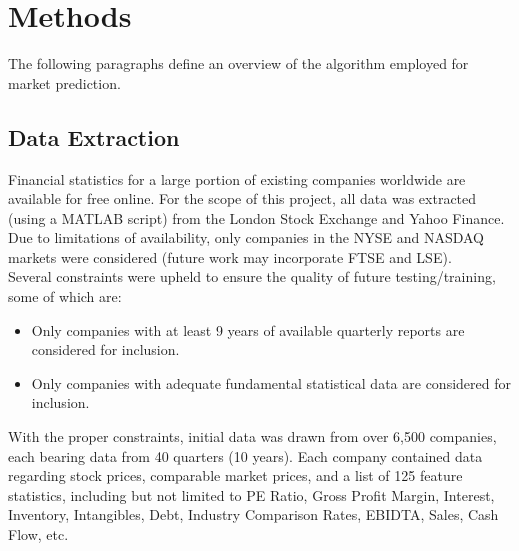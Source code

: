 \documentclass[preprint,12pt]{elsarticle}
\begin{document}

\section{Methods}
\label{S:2}

The following paragraphs define an overview of the algorithm employed for market prediction. 

\subsection{Data Extraction}


Financial statistics for a large portion of existing companies worldwide are available for free online. For the scope of this project, all data was extracted (using a MATLAB script) from the London Stock Exchange and Yahoo Finance. Due to limitations of availability, only companies in the NYSE and NASDAQ markets were considered (future work may incorporate FTSE and LSE).\\

Several constraints were upheld to ensure the quality of future testing/training, some of which are:
\begin{itemize}
	\item Only companies with at least 9 years of available quarterly reports are considered for inclusion. 
    \item Only companies with adequate fundamental statistical data are considered for inclusion.
\end{itemize}

With the proper constraints, initial data was drawn from over 6,500 companies, each bearing data from 40 quarters (10 years). Each company contained data regarding stock prices, comparable market prices, and a list of 125 feature statistics, including but not limited to PE Ratio, Gross Profit Margin, Interest, Inventory, Intangibles, Debt, Industry Comparison Rates, EBIDTA, Sales, Cash Flow, etc. 
\end{document}
